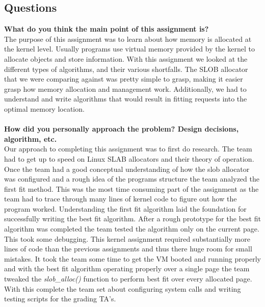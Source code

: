 \documentclass[10pt,onecolumn,draftclsnofoot]{IEEEtran} %
\begin{document}
\begin{singlespace}
\section{\bf Questions}
        \textbf{What do you think the main point of this assignment is?}\\
                \normalfont \indent The purpose of this assignment was to learn about how memory is allocated at the kernel level. Usually programs use virtual memory provided by the kernel to allocate objects and store information.  With this assignment we looked at the different types of algorithms, and their various shortfalls.  The SLOB allocator that we were comparing against was pretty simple to grasp, making it easier grasp how memory allocation and management work. Additionally, we had to understand and write algorithms that would result in fitting requests into the optimal memory location. \\\\
       \textbf{How did you personally approach the problem? Design decisions, algorithm, etc.}\\
	  		\normalfont \indent Our approach to completing this assignment was to first do research. The team had to get up to speed on Linux SLAB allocators and their theory of operation. Once the team had a good conceptual understanding of how the slob allocator was configured and a rough idea of the programs structure the team analyzed the first fit method. This was the most time consuming part of the assignment as the team had to trace through many lines of kernel code to figure out how the program worked. Understanding the first fit algorithm laid the foundation for successfully writing the best fit algorithm. After a rough prototype for the best fit algorithm was completed the team tested the algorithm only on the current page. This took some debugging. This kernel assignment required substantially more lines of code than the previous assignments and thus there huge room for small mistakes. It took the team some time to get the VM booted and running properly and with the best fit algorithm operating properly over a single page the team tweaked the \textit{slob\_alloc()} function to perform best fit over every allocated page. With this complete the team set about configuring system calls and writing testing scripts for the grading TA's.
 

\end{singlespace}
\end{document}
